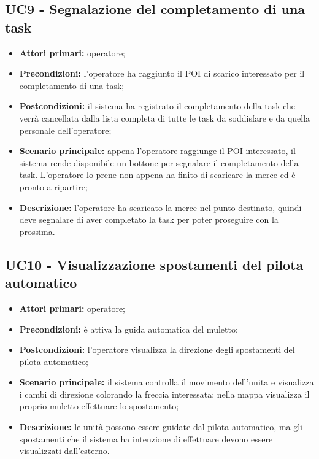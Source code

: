 \subsection{UC9 - Segnalazione del completamento di una task}
\begin{itemize}
	\item 	\textbf{Attori primari:} operatore;
	\item 	\textbf{Precondizioni:} l'operatore ha raggiunto il POI di scarico interessato per il completamento di una task;
	\item 	\textbf{Postcondizioni:} il sistema ha registrato il completamento della task che verrà cancellata dalla lista completa di tutte le task da soddisfare e da quella personale dell'operatore;
	\item 	\textbf{Scenario principale:} appena l'operatore raggiunge il POI interessato, il sistema rende disponibile un bottone per segnalare il completamento della task. L'operatore lo prene non appena ha finito di scaricare la merce ed è pronto a ripartire;
	\item 	\textbf{Descrizione:} l'operatore ha scaricato la merce nel punto destinato, quindi deve segnalare di aver completato la task per poter proseguire con la prossima.

\end{itemize}

\subsection{UC10 - Visualizzazione spostamenti del pilota automatico}
\begin{itemize}
	\item 	\textbf{Attori primari:} operatore;
	\item 	\textbf{Precondizioni:} è attiva la guida automatica del muletto;
	\item 	\textbf{Postcondizioni:} l'operatore visualizza la direzione degli spostamenti del pilota automatico;
	\item 	\textbf{Scenario principale:} il sistema controlla il movimento dell'unita e visualizza i cambi di direzione colorando la freccia interessata; nella mappa visualizza il proprio muletto effettuare lo spostamento;
	\item 	\textbf{Descrizione:} le unità possono essere guidate dal pilota automatico, ma gli spostamenti che il sistema ha intenzione di effettuare devono essere visualizzati dall'esterno.

\end{itemize}
 

